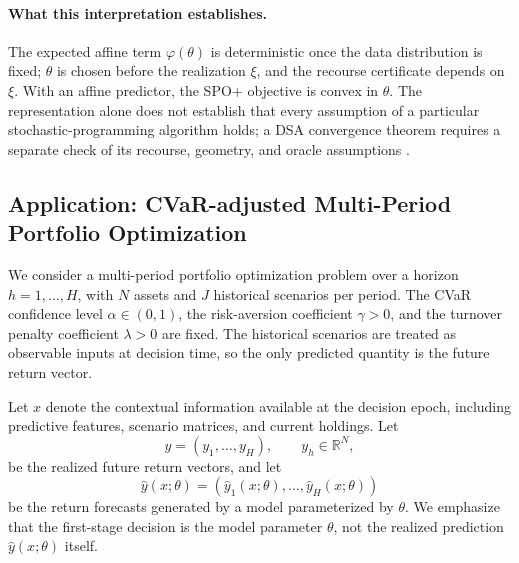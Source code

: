 \documentclass[11pt]{article}
\theoremstyle{definition}
\begin{document}
\paragraph{What this interpretation establishes.}
The expected affine term $\varphi(\theta)$ is deterministic once the data distribution is fixed; $\theta$ is chosen before the realization $\xi$, and the recourse certificate depends on $\xi$. With an affine predictor, the SPO+ objective is convex in $\theta$. The representation alone does not establish that every assumption of a particular stochastic-programming algorithm holds; a DSA convergence theorem requires a separate check of its recourse, geometry, and oracle assumptions \cite{lan2021}.

\subsection{Application: CVaR-adjusted Multi-Period Portfolio Optimization}

\indent We consider a multi-period portfolio optimization problem over a horizon
$h=1,\dots,H$, with $N$ assets and $J$ historical scenarios per period. The
CVaR confidence level $\alpha\in(0,1)$, the risk-aversion coefficient
$\gamma>0$, and the turnover penalty coefficient $\lambda>0$ are fixed.
The historical scenarios are treated as observable inputs at decision time,
so the only predicted quantity is the future return vector.

Let $x$ denote the contextual information available at the decision epoch,
including predictive features, scenario matrices, and current holdings.
Let
\[
y=(y_1,\dots,y_H),\qquad y_h\in\mathbb R^N,
\]
be the realized future return vectors, and let
\[
\hat y(x;\theta)=(\hat y_1(x;\theta),\dots,\hat y_H(x;\theta))
\]
be the return forecasts generated by a model parameterized by $\theta$.
We emphasize that the first-stage decision is the model parameter $\theta$,
not the realized prediction $\hat y(x;\theta)$ itself.
\end{document}
